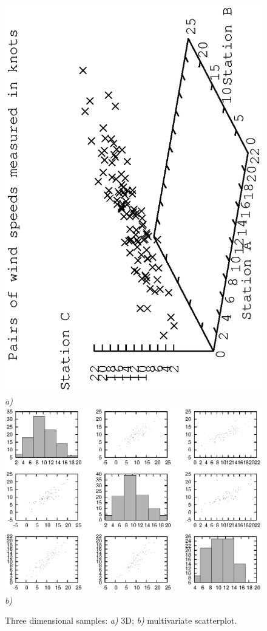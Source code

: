 \documentclass[12pt,a4paper]{article}
\begin{document}
\begin{description}
\begin{figure}
\begin{center}
\includegraphics[scale=1.0,angle=270]{dataplot5.eps} \\
\emph{a)} \\ 
\includegraphics[scale=1.0]{dataplot6.eps} \\
\emph{b)} \\
\caption{Three dimensional samples: \emph{a)} 3D; \emph{b)} multivariate scatterplot.}
\label{fig3}
\end{center}
\end{figure}


\end{description}
\end{document}

